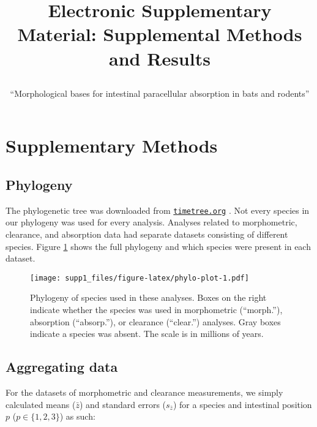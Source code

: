 \documentclass[12pt,]{article}
\title{
    Electronic Supplementary Material: Supplemental Methods and Results
                \\
        \vspace*{1ex}
        \subtitle{``Morphological bases for intestinal paracellular absorption in bats and rodents''}
        }
\author{}
\date{}
\makeatletter
\def\maketitle{{%
  \renewenvironment{tabular}[2][]
    {\begin{flushleft}}
    {\end{flushleft}}
  \AB@maketitle}}
\makeatother
\begin{document}
            \maketitle
        


        {
                    \hypersetup{linkcolor=}
                \setcounter{tocdepth}{2}
        \tableofcontents
    }
    
\raggedright

\hypertarget{supplementary-methods}{%
\section{Supplementary Methods}\label{supplementary-methods}}

\hypertarget{phylogeny}{%
\subsection{Phylogeny}\label{phylogeny}}

The phylogenetic tree was downloaded from \href{timetree.org}{\texttt{timetree.org}}
\citep{Kumar_2017}.
Not every species in our phylogeny was used for every analysis.
Analyses related to morphometric, clearance, and absorption data had separate
datasets consisting of different species.
Figure \ref{fig:phylo-plot} shows the full phylogeny and which species were
present in each dataset.

\begin{figure}
\centering
\texttt{[image: supp1\_files/figure-latex/phylo-plot-1.pdf]}
\caption{\label{fig:phylo-plot}Phylogeny of species used in these analyses. Boxes on the right indicate whether the species was used in morphometric (``morph.''), absorption (``absorp.''), or clearance (``clear.'') analyses. Gray boxes indicate a species was absent. The scale is in millions of years.}
\end{figure}

\hypertarget{aggregating-data}{%
\subsection{Aggregating data}\label{aggregating-data}}

For the datasets of morphometric and clearance measurements, we simply calculated
means (\(\bar{z}\)) and standard errors (\(s_{\bar{z}}\)) for a species and
intestinal position \(p\) (\(p \in \{ 1, 2, 3 \}\)) as such:
\end{document}

